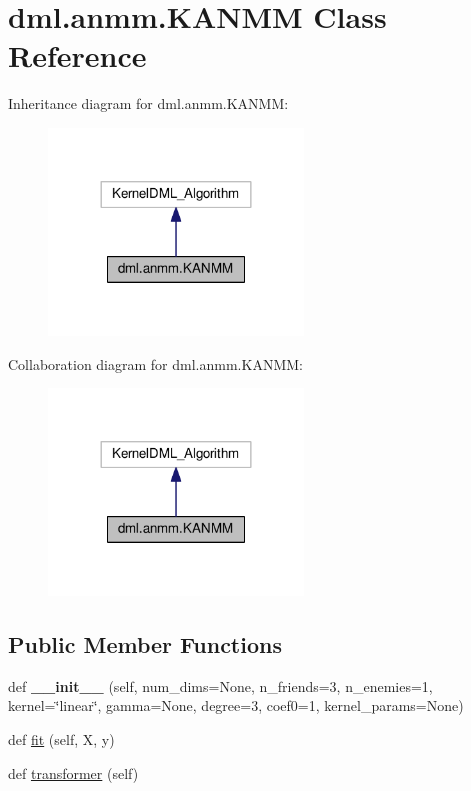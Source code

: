 \hypertarget{classdml_1_1anmm_1_1KANMM}{}\section{dml.\+anmm.\+K\+A\+N\+MM Class Reference}
\label{classdml_1_1anmm_1_1KANMM}


Inheritance diagram for dml.\+anmm.\+K\+A\+N\+MM\+:
\nopagebreak
\begin{figure}[H]
\begin{center}
\leavevmode
\includegraphics[width=192pt]{classdml_1_1anmm_1_1KANMM__inherit__graph}
\end{center}
\end{figure}


Collaboration diagram for dml.\+anmm.\+K\+A\+N\+MM\+:
\nopagebreak
\begin{figure}[H]
\begin{center}
\leavevmode
\includegraphics[width=192pt]{classdml_1_1anmm_1_1KANMM__coll__graph}
\end{center}
\end{figure}
\subsection*{Public Member Functions}
\begin{DoxyCompactItemize}
\item 
def {\bfseries \+\_\+\+\_\+init\+\_\+\+\_\+} (self, num\+\_\+dims=None, n\+\_\+friends=3, n\+\_\+enemies=1, kernel=\char`\"{}linear\char`\"{}, gamma=None, degree=3, coef0=1, kernel\+\_\+params=None)\hypertarget{classdml_1_1anmm_1_1KANMM_a27564180c8e609b664a9682ff062c494}{}\label{classdml_1_1anmm_1_1KANMM_a27564180c8e609b664a9682ff062c494}

\item 
def \hyperlink{classdml_1_1anmm_1_1KANMM_a48d48a25293d9816baccc3d5498b5558}{fit} (self, X, y)
\item 
def \hyperlink{classdml_1_1anmm_1_1KANMM_a20b5a78cf977077120a10bc0d8716ddf}{transformer} (self)
\end{DoxyCompactItemize}
